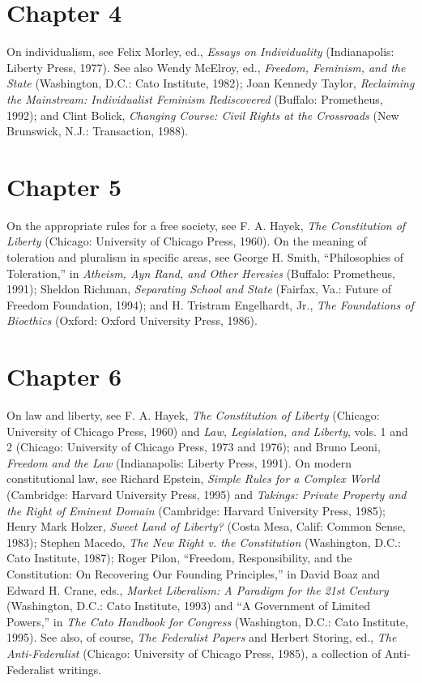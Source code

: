 \section*{Chapter 4}
On individualism, see Felix Morley, ed., \textit{Essays on Individuality} (Indianapolis: Liberty Press, 1977). See also Wendy McElroy, ed., \textit{Freedom, Feminism, and the State} (Washington, D.C.: Cato Institute, 1982); Joan Kennedy
Taylor, \textit{Reclaiming the Mainstream: Individualist Feminism Rediscovered} (Buffalo: Prometheus, 1992); and Clint Bolick, \textit{Changing Course: Civil Rights at the
Crossroads} (New Brunswick, N.J.: Transaction, 1988).

\section*{Chapter 5}
On the appropriate rules for a free society, see F. A. Hayek, \textit{The Constitution of Liberty} (Chicago: University of Chicago Press, 1960). On the meaning
of toleration and pluralism in specific areas, see George H. Smith, ``Philosophies of Toleration,'' in \textit{Atheism, Ayn Rand, and Other Heresies} (Buffalo:
Prometheus, 1991); Sheldon Richman, \textit{Separating School and State} (Fairfax, Va.: Future of Freedom Foundation, 1994); and H. Tristram Engelhardt, Jr.,
\textit{The Foundations of Bioethics} (Oxford: Oxford University Press, 1986).
\section*{Chapter 6}
On law and liberty, see F. A. Hayek, \textit{The Constitution of Liberty} (Chicago:
University of Chicago Press, 1960) and \textit{Law, Legislation, and Liberty}, vols. 1
and 2 (Chicago: University of Chicago Press, 1973 and 1976); and Bruno Leoni, \textit{Freedom and the Law} (Indianapolis: Liberty Press, 1991). On modern
constitutional law, see Richard Epstein, \textit{Simple Rules for a Complex World}
(Cambridge: Harvard University Press, 1995) and \textit{Takings: Private Property
and the Right of Eminent Domain} (Cambridge: Harvard University Press,
1985); Henry Mark Holzer, \textit{Sweet Land of Liberty?} (Costa Mesa, Calif: Common Sense, 1983); Stephen Macedo, \textit{The New Right v. the Constitution} (Washington, D.C.: Cato Institute, 1987); Roger Pilon, ``Freedom, Responsibility,
and the Constitution: On Recovering Our Founding Principles,'' in David Boaz and Edward H. Crane, eds., \textit{Market Liberalism: A Paradigm for the 21st
Century} (Washington, D.C.: Cato Institute, 1993) and ``A Government of
Limited Powers,'' in \textit{The Cato Handbook for Congress} (Washington, D.C.: Cato
Institute, 1995). See also, of course, \textit{The Federalist Papers} and Herbert Storing, ed., \textit{The Anti-Federalist} (Chicago: University of Chicago Press, 1985), a
collection of Anti-Federalist writings.
